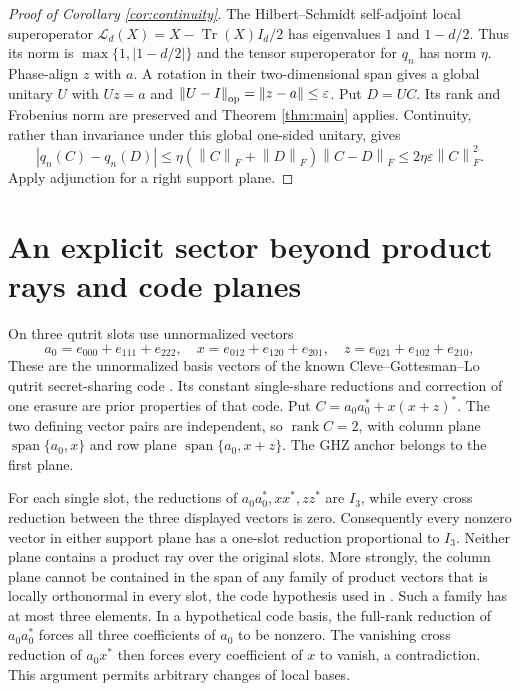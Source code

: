 \documentclass[11pt,a4paper]{article}
\newcommand{\tr}{\operatorname{Tr}}
\newcommand{\rank}{\operatorname{rank}}
\newcommand{\norm}[1]{\left\lVert#1\right\rVert}
\begin{document}
\begin{proof}[Proof of Corollary \ref{cor:continuity}]
The Hilbert--Schmidt self-adjoint local superoperator $\mathcal L_d(X)=X-\tr(X)I_d/2$ has eigenvalues $1$ and $1-d/2$. Thus its norm is $\max\{1,|1-d/2|\}$ and the tensor superoperator for $q_n$ has norm $\eta$. Phase-align $z$ with $a$. A rotation in their two-dimensional span gives a global unitary $U$ with $Uz=a$ and $\norm{U-I}_{\rm op}=\norm{z-a}\le\varepsilon$. Put $D=UC$. Its rank and Frobenius norm are preserved and Theorem \ref{thm:main} applies. Continuity, rather than invariance under this global one-sided unitary, gives
\[
 |q_n(C)-q_n(D)|\le\eta(\norm C_F+\norm D_F)\norm{C-D}_F
 \le2\eta\varepsilon\norm C_F^2.
\]
Apply adjunction for a right support plane.
\end{proof}

\section{An explicit sector beyond product rays and code planes}
On three qutrit slots use unnormalized vectors
\[
 a_0=e_{000}+e_{111}+e_{222},\quad
 x=e_{012}+e_{120}+e_{201},\quad
 z=e_{021}+e_{102}+e_{210},
\]
These are the unnormalized basis vectors of the known Cleve--Gottesman--Lo qutrit secret-sharing code \cite[Eq.~(1)]{cleve}. Its constant single-share reductions and correction of one erasure are prior properties of that code. Put $C=a_0a_0^*+x(x+z)^*$. The two defining vector pairs are independent, so $\rank C=2$, with column plane $\operatorname{span}\{a_0,x\}$ and row plane $\operatorname{span}\{a_0,x+z\}$. The GHZ anchor belongs to the first plane.

For each single slot, the reductions of $a_0a_0^*,xx^*,zz^*$ are $I_3$, while every cross reduction between the three displayed vectors is zero. Consequently every nonzero vector in either support plane has a one-slot reduction proportional to $I_3$. Neither plane contains a product ray over the original slots. More strongly, the column plane cannot be contained in the span of any family of product vectors that is locally orthonormal in every slot, the code hypothesis used in \cite[Appendix C.2]{wuzou}. Such a family has at most three elements. In a hypothetical code basis, the full-rank reduction of $a_0a_0^*$ forces all three coefficients of $a_0$ to be nonzero. The vanishing cross reduction of $a_0x^*$ then forces every coefficient of $x$ to vanish, a contradiction. This argument permits arbitrary changes of local bases.
\end{document}
